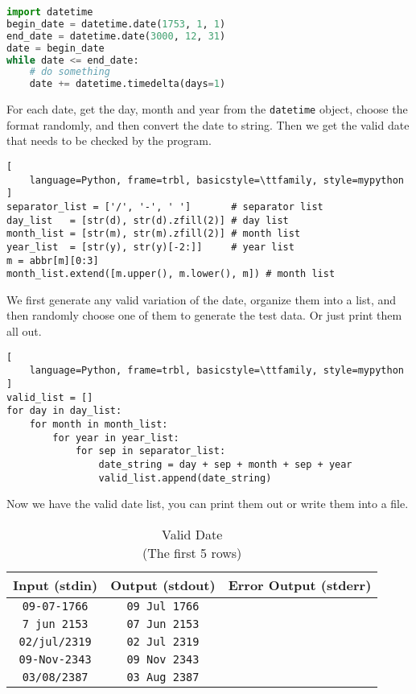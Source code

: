 \documentclass[a4paper,12pt]{article} %
\begin{document}
\begin{lstlisting}[language=Python, frame=trbl, basicstyle=\ttfamily, style=mypython]
import datetime    
begin_date = datetime.date(1753, 1, 1)
end_date = datetime.date(3000, 12, 31)
date = begin_date
while date <= end_date:
    # do something
    date += datetime.timedelta(days=1)
\end{lstlisting}

For each date, get the day, month and year from the \texttt{datetime} object, 
choose the format randomly, and then convert the date to string. 
Then we get the valid date that needs to be checked by the program. 
\\



\begin{lstlisting}[
    language=Python, frame=trbl, basicstyle=\ttfamily, style=mypython
]
separator_list = ['/', '-', ' ']       # separator list
day_list   = [str(d), str(d).zfill(2)] # day list
month_list = [str(m), str(m).zfill(2)] # month list
year_list  = [str(y), str(y)[-2:]]     # year list
m = abbr[m][0:3]
month_list.extend([m.upper(), m.lower(), m]) # month list
\end{lstlisting}

We first generate any valid variation of the date, 
organize them into a list, and then randomly choose one of them to generate the test data. 
Or just print them all out.

\begin{lstlisting}[
    language=Python, frame=trbl, basicstyle=\ttfamily, style=mypython
]
valid_list = []
for day in day_list:
    for month in month_list:
        for year in year_list:
            for sep in separator_list:
                date_string = day + sep + month + sep + year
                valid_list.append(date_string)
\end{lstlisting}

Now we have the valid date list, you can print them out or write them into a file. 

\begin{table}[h]
    \centering
    \caption{Valid Date \\ (The first 5 rows)}
    \begin{tabular}{|c|c|c|}
        \hline
        \textbf{Input (stdin)} & \textbf{Output (stdout)} & \textbf{Error Output (stderr)} \\
        \hline
        \texttt {09-07-1766} & \texttt {09 Jul 1766} &  \\
        \texttt {7 jun 2153} & \texttt {07 Jun 2153} &  \\
        \texttt {02/jul/2319} & \texttt {02 Jul 2319} &  \\
        \texttt {09-Nov-2343} & \texttt {09 Nov 2343} &  \\
        \texttt {03/08/2387} & \texttt {03 Aug 2387} & \\
        \hline
    \end{tabular}
\end{table}
  
\end{document}
